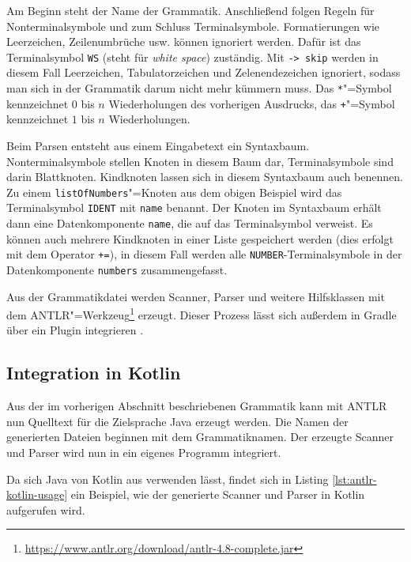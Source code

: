 Am Beginn steht der Name der Grammatik. Anschließend folgen Regeln für Nonterminalsymbole und zum Schluss Terminalsymbole. Formatierungen wie Leerzeichen, Zeilenumbrüche usw. können ignoriert werden. Dafür ist das Terminalsymbol \lstinline{WS} (steht für \emph{white space}) zuständig. Mit \lstinline{-> skip} werden in diesem Fall Leerzeichen, Tabulatorzeichen und Zelenendezeichen ignoriert, sodass man sich in der Grammatik darum nicht mehr kümmern muss. Das \lstinline{*}"=Symbol kennzeichnet $0$ bis $n$ Wiederholungen des vorherigen Ausdrucks, das \lstinline{+}"=Symbol kennzeichnet $1$ bis $n$ Wiederholungen.

Beim Parsen entsteht aus einem Eingabetext ein Syntaxbaum. Nonterminalsymbole stellen Knoten in diesem Baum dar, Terminalsymbole sind darin Blattknoten. Kindknoten lassen sich in diesem Syntaxbaum auch benennen. Zu einem \lstinline{listOfNumbers}"=Knoten aus dem obigen Beispiel wird das Terminalsymbol \lstinline{IDENT} mit \lstinline{name} benannt. Der Knoten im Syntaxbaum erhält dann eine Datenkomponente \lstinline{name}, die auf das Terminalsymbol verweist. Es können auch mehrere Kindknoten in einer Liste gespeichert werden (dies erfolgt mit dem Operator \lstinline{+=}), in diesem Fall werden alle \lstinline{NUMBER}-Terminalsymbole in der Datenkomponente \lstinline{numbers} zusammengefasst.

Aus der Grammatikdatei werden Scanner, Parser und weitere Hilfsklassen mit dem ANTLR"=Werkzeug\footnote{\url{https://www.antlr.org/download/antlr-4.8-complete.jar}} erzeugt. Dieser Prozess lässt sich außerdem in Gradle über ein Plugin integrieren \cite{GradleANTLRPlugin}.

\subsection{Integration in Kotlin}

Aus der im vorherigen Abschnitt beschriebenen Grammatik kann mit ANTLR nun Quelltext für die Zielsprache Java erzeugt werden. Die Namen der generierten Dateien beginnen mit dem Grammatiknamen. Der erzeugte Scanner und Parser wird nun in ein eigenes Programm integriert.

Da sich Java von Kotlin aus verwenden lässt, findet sich in Listing \ref{lst:antlr-kotlin-usage} ein Beispiel, wie der generierte Scanner und Parser in Kotlin aufgerufen wird. 



